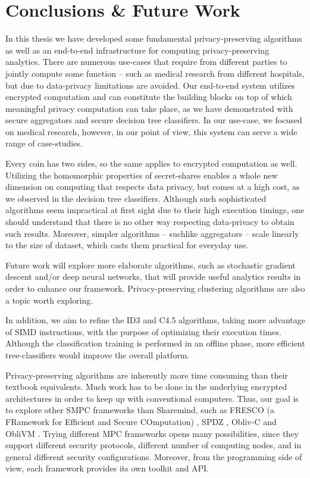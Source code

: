 \chapter{Conclusions \& Future Work}\label{c:conclusions}
In this thesis we have developed some fundamental privacy\hyp preserving algorithms as well as an end\hyp to\hyp end infrastructure for computing privacy\hyp preserving analytics.
There are numerous use\hyp cases that require from different parties to jointly compute some function -- such as medical research from different hospitals, but due to data\hyp privacy limitations are avoided.
Our end\hyp to\hyp end system utilizes encrypted computation and can constitute the building blocks on top of which meaningful privacy computation can take place, as we have demonstrated with secure aggregators and secure decision tree classifiers.
In our use\hyp case, we focused on medical research, however, in our point of view, this system can serve a wide range of case\hyp studies.


Every coin has two sides, so the same applies to encrypted computation as well.
Utilizing the homomorphic properties of secret\hyp shares enables a whole new dimension on computing that respects data privacy, but comes at a high cost, as we observed in the decision tree classifiers.
Although such sophisticated algorithms seem impractical at first sight due to their high execution timings, one should understand that there is no other way respecting data\hyp privacy to obtain such results.
Moreover, simpler algorithms -- suchlike aggregators -- scale linearly to the size of dataset, which casts them practical for everyday use.


Future work will explore more elaborate algorithms, such as stochastic gradient descent \cite{shokri2015privacy} and/or deep neural networks, that will provide useful analytics results in order to enhance our framework.
Privacy\hyp preserving clustering algorithms \cite{jha2005privacy, upmanyu2010efficient, jagannathan2006new} are also a topic worth exploring.


In addition, we aim to refine the ID3 and C4.5 algorithms, taking more advantage of SIMD instructions, with the purpose of optimizing their execution times.
Although the classification training is performed in an offline phase, more efficient tree\hyp classifiers would improve the overall platform.


Privacy\hyp preserving algorithms are inherently more time consuming than their textbook equivalents.
Much work has to be done in the underlying encrypted architectures in order to keep up with conventional computers.
Thus, our goal is to explore other SMPC frameworks than Sharemind, such as FRESCO (a FRamework for Efficient and Secure COmputation) \cite{chan2017privacy, alxd1}, SPDZ \cite{damgaard2012multiparty, damgaard2013practical}, Obliv\hyp C \cite{zahur2015obliv} and ObliVM \cite{liu2015oblivm}.
Trying different MPC frameworks opens many possibilities, since they support different security protocols, different number of computing nodes, and in general different security configurations.
Moreover, from the programming side of view, each framework provides its own toolkit and API. 



